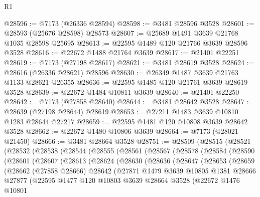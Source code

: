 \begin{lexlean}{R1}
\begin{coremodule}
@28596 := @7173 (@26336 @28594)
@28598 := @3481 @28596 @3528
@28601 := @28593 (@25676 @28598) @28573
@28607 := @25689 @1491 @3639 @21768 @1035 @28598 @25695
@28613 := @22595 @1489 @120 @21766 @3639 @28596 @3528
@28616 := @22672 @1488 @21764 @3639
@28617 := @21401 @22251
@28619 := @7173 (@27198 @28617)
@28621 := @3481 @28619 @3528
@28624 := @28616 (@26336 @28621) @28596
@28630 := @26349 @1487 @3639 @21763 @1133 @28621 @26355
@28636 := @22595 @1485 @120 @21761 @3639 @28619 @3528
@28639 := @22672 @1484 @10811 @3639
@28640 := @21401 @22250
@28642 := @7173 (@27858 @28640)
@28644 := @3481 @28642 @3528
@28647 := @28639 (@27198 @28644) @28619
@28653 := @27211 @1483 @3639 @10810 @1283 @28644 @27217
@28659 := @22595 @1481 @120 @10808 @3639 @28642 @3528
@28662 := @22672 @1480 @10806 @3639
@28664 := @7173 (@28021 @21450)
@28666 := @3481 @28664 @3528
@28751 := @28509
    (@28515
      (@28521
        (@28532
          (@28538
            (@28544
              (@28555
                (@28561
                  (@28567
                    (@28578
                      (@28584
                        (@28590
                          (@28601
                            (@28607
                              (@28613
                                (@28624
                                  (@28630
                                    (@28636
                                      (@28647
                                        (@28653
                                          (@28659
                                            (@28662
                                              (@27858 @28666)
                                              @28642
                                              (@27871
                                                @1479
                                                @3639
                                                @10805
                                                @1381
                                                @28666
                                                @27877
                                                (@22595
                                                  @1477
                                                  @120
                                                  @10803
                                                  @3639
                                                  @28664
                                                  @3528
                                                  (@22672
                                                    @1476
                                                    @10801

\end{coremodule}
\end{lexlean}
